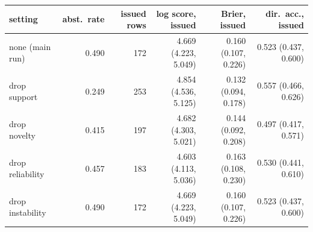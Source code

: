\begin{tabular}{lrrrrr}
\toprule
setting & abst.\ rate & issued rows & log score, issued & Brier, issued & dir.\ acc., issued \\
\midrule
none (main run) & 0.490 & 172 & 4.669 (4.223, 5.049) & 0.160 (0.107, 0.226) & 0.523 (0.437, 0.600) \\
drop support & 0.249 & 253 & 4.854 (4.536, 5.125) & 0.132 (0.094, 0.178) & 0.557 (0.466, 0.626) \\
drop novelty & 0.415 & 197 & 4.682 (4.303, 5.021) & 0.144 (0.092, 0.208) & 0.497 (0.417, 0.571) \\
drop reliability & 0.457 & 183 & 4.603 (4.113, 5.036) & 0.163 (0.108, 0.230) & 0.530 (0.441, 0.610) \\
drop instability & 0.490 & 172 & 4.669 (4.223, 5.049) & 0.160 (0.107, 0.226) & 0.523 (0.437, 0.600) \\
\bottomrule
\end{tabular}
